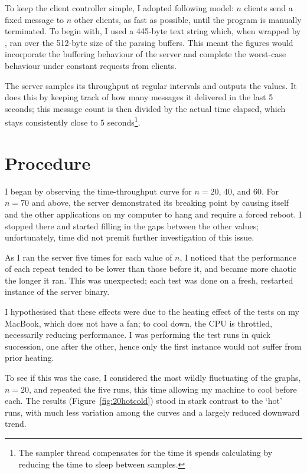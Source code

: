 To keep the client controller simple, I adopted following model: $n$ clients send a fixed message to $n$ other clients, as fast as possible, until the program is manually terminated. To begin with, I used a 445-byte text string which, when wrapped by , ran over the 512-byte size of the parsing buffers. This meant the figures would incorporate the buffering behaviour of the server and complete the worst-case behaviour under constant requests from clients.

The server samples its throughput at regular intervals and outputs the values. It does this by keeping track of how many messages it delivered in the last 5 seconds; this message count is then divided by the actual time elapsed, which stays consistently close to 5 seconds\footnote{The sampler thread compensates for the time it spends calculating by reducing the time to sleep between samples. }.

\section{Procedure}
I began by observing the time-throughput curve for $n=20$, 40, and 60. For $n=70$ and above, the server demonstrated its breaking point by causing itself and the other applications on my computer to hang and require a forced reboot. I stopped there and started filling in the gaps between the other values; unfortunately, time did not premit further investigation of this issue.

As I ran the server five times for each value of $n$, I noticed that the performance of each repeat tended to be lower than those before it, and became more chaotic the longer it ran. This was unexpected; each test was done on a fresh, restarted instance of the server binary.

I hypothesised that these effects were due to the heating effect of the tests on my MacBook, which does not have a fan; to cool down, the CPU is throttled, necessarily reducing performance. I was performing the test runs in quick succession, one after the other, hence only the first instance would not suffer from prior heating.

To see if this was the case, I considered the most wildly fluctuating of the graphs, $n=20$, and repeated the five runs, this time allowing my machine to cool before each. The results (Figure~\ref{fig:20hotcold}) stood in stark contrast to the `hot' runs, with much less variation among the curves and a largely reduced downward trend.

